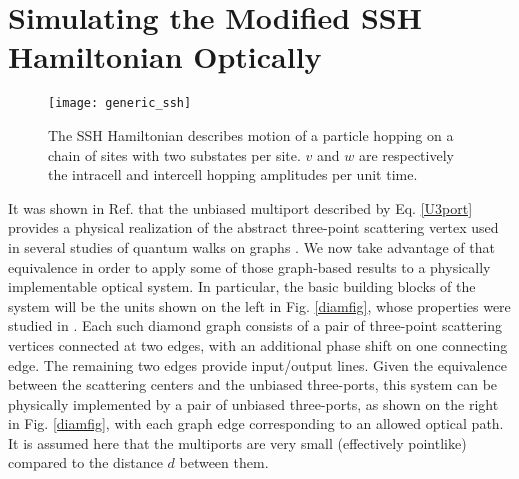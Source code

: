 \documentclass[twocolumn,amsmath, amssymb, superscriptaddress, pra]{revtex4}
\begin{document}



\section{Simulating the Modified SSH Hamiltonian Optically}\label{sshsection}



\begin{figure}%
\centering
\texttt{[image: generic\_ssh]}
\caption{The SSH Hamiltonian describes motion of a particle hopping on a chain of sites with two substates per site. $v$ and $w$ are respectively the intracell and intercell hopping amplitudes per unit time.}
\label{sshfig}
\end{figure}

It was shown in Ref. \cite{threeport} that the unbiased multiport described
by Eq. \ref{U3port} provides a physical realization of the abstract
three-point scattering vertex used in several studies of quantum walks on
graphs \cite{fh1,fh2,fh3}. We now take advantage of that equivalence in order
to apply some of those graph-based results to a physically implementable
optical system. In particular, the basic building blocks of the system will
be the units shown on the left in Fig. \ref{diamfig}, whose properties were
studied in \cite{fh1,fh2,fh3}. Each such diamond graph consists of a pair of
three-point scattering vertices connected at two edges, with an additional
phase shift on one connecting edge. The remaining two edges provide
input/output lines. Given the equivalence between the scattering centers and
the unbiased three-ports, this system can be physically implemented by a pair
of unbiased three-ports, as shown on the right in Fig. \ref{diamfig}, with
each graph edge corresponding to an allowed optical path. It is assumed here
that the multiports are very small (effectively pointlike) compared to the
distance $d$ between them.
\end{document}
